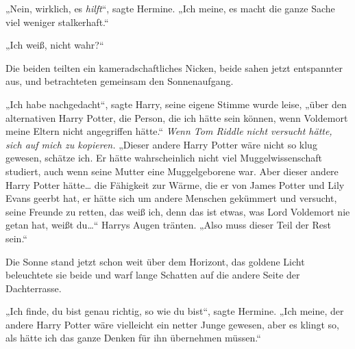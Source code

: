 „Nein, wirklich, es \emph{hilft}“, sagte Hermine. „Ich meine, es macht die ganze Sache viel weniger stalkerhaft.“

„Ich weiß, nicht wahr?“

Die beiden teilten ein kameradschaftliches Nicken, beide sahen jetzt entspannter aus, und betrachteten gemeinsam den Sonnenaufgang.

„Ich habe nachgedacht“, sagte Harry, seine eigene Stimme wurde leise, „über den alternativen Harry Potter, die Person, die ich hätte sein können, wenn Voldemort meine Eltern nicht angegriffen hätte.“
\emph{Wenn Tom Riddle nicht versucht hätte, sich auf mich zu kopieren.}
„Dieser andere Harry Potter wäre nicht so klug gewesen, schätze ich. Er hätte wahrscheinlich nicht viel Muggelwissenschaft studiert, auch wenn seine Mutter eine Muggelgeborene war. Aber dieser andere Harry Potter hätte… die Fähigkeit zur Wärme, die er von James Potter und Lily Evans geerbt hat, er hätte sich um andere Menschen gekümmert und versucht, seine Freunde zu retten, das weiß ich, denn das ist etwas, was Lord Voldemort nie getan hat, weißt du…“
Harrys Augen tränten.
„Also muss dieser Teil der Rest sein.“

Die Sonne stand jetzt schon weit über dem Horizont, das goldene Licht beleuchtete sie beide und warf lange Schatten auf die andere Seite der Dachterrasse.

„Ich finde, du bist genau richtig, so wie du bist“, sagte Hermine. „Ich meine, der andere Harry Potter wäre vielleicht ein netter Junge gewesen, aber es klingt so, als hätte ich das ganze Denken für ihn übernehmen müssen.“


